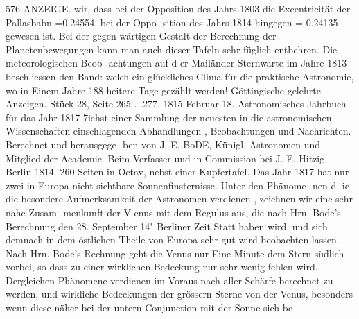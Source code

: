 \documentclass[12pt,a4paper]{article}
\begin{document}
\newpage
576 ANZEIGE.\newline
wir, dass bei der Opposition des Jahrs 1803 die Excentricität der Pallasbabn =0.24554, bei der Oppo-\newline
sition des Jahrs 1814 hingegen = 0.24135 gewesen ist. Bei der gegen-wärtigen Gestalt der Berechnung der\newline
Planetenbewegungen kann man auch dieser Tafeln sehr füglich entbehren. Die meteorologischen Beob-\newline
achtungen auf d er Mailänder Sternwarte im Jahre 1813 beschliessen den Band: welch ein glückliches\newline
Clima für die praktische Astronomie, wo in Einem Jahre 188 heitere Tage gezählt werden!\newline
Göttingische gelehrte Anzeigen. Stück 28, Seite 265 . .277. 1815 Februar 18.\newline
Astronomisches Jahrbuch für das Jahr 1817 7iehst einer Sammlung der neuesten in die astronomischen\newline
Wissenschaften einschlagenden Abhandlungen , Beobachtungen und Nachrichten. Berechnet und herausgege-\newline
ben von J. E. BoDE, Künigl. Astronomen und Mitglied der Academie. Beim Verfasser und in Commission\newline
bei J. E. Hitzig. Berlin 1814. 260 Seiten in Octav, nebst einer Kupfertafel.\newline
Das Jahr 1817 hat nur zwei in Europa nicht sichtbare Sonnenfinsternisse. Unter den Phänome-\newline
nen d, ie die besondere Aufmerksamkeit der Astronomen verdienen , zeichnen wir eine sehr nahe Zusam-\newline
menkunft der V enus mit dem Regulus aus, die nach Hrn. Bode's Berechnung den 28. September 14"\newline
Berliner Zeit Statt haben wird, und sich demnach in dem östlichen Theile von Europa sehr gut wird\newline
beobachten lassen. Nach Hrn. Bode's Rechnung geht die Venus nur Eine Minute dem Stern südlich\newline
vorbei, so dass zu einer wirklichen Bedeckung nur sehr wenig fehlen wird. Dergleichen Phänomene\newline
verdienen im Voraus nach aller Schärfe berechnet zu werden, und wirkliche Bedeckungen der grössern\newline
Sterne von der Venus, besonders wenn diese näher bei der untern Conjunction mit der Sonne sich be-\newline
\end{document}
